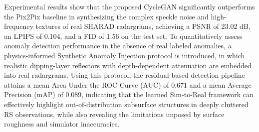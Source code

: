 Experimental results show that the proposed CycleGAN significantly outperforms the Pix2Pix baseline in synthesizing the complex speckle noise and high-frequency textures of real SHARAD radargrams, achieving a PSNR of 23.02 dB, an LPIPS of 0.104, and a FID of 1.56 on the test set.
To quantitatively assess anomaly detection performance in the absence of real labeled anomalies, a physics-informed Synthetic Anomaly Injection protocol is introduced, in which realistic dipping-layer reflectors with depth-dependent attenuation are embedded into real radargrams.
Using this protocol, the residual-based detection pipeline attains a mean Area Under the ROC Curve (AUC) of 0.671 and a mean Average Precision (mAP) of 0.089, indicating that the learned Sim-to-Real framework can effectively highlight out-of-distribution subsurface structures in deeply cluttered RS observations, while also revealing the limitations imposed by surface roughness and simulator inaccuracies.

